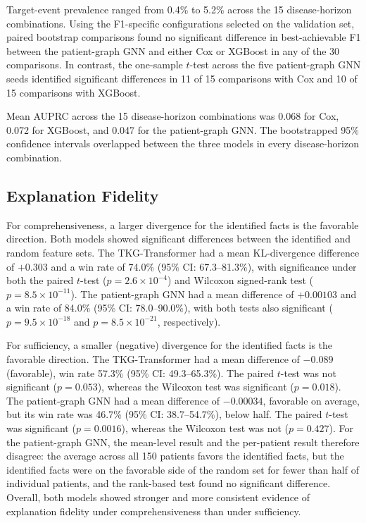 Target-event prevalence ranged from 0.4\% to 5.2\% across the 15 disease-horizon combinations. Using the F1-specific configurations selected on the validation set, paired bootstrap comparisons found no significant difference in best-achievable F1 between the patient-graph GNN and either Cox or XGBoost in any of the 30 comparisons. In contrast, the one-sample $t$-test across the five patient-graph GNN seeds identified significant differences in 11 of 15 comparisons with Cox and 10 of 15 comparisons with XGBoost.

Mean AUPRC across the 15 disease-horizon combinations was 0.068 for Cox, 0.072 for XGBoost, and 0.047 for the patient-graph GNN. The bootstrapped 95\% confidence intervals overlapped between the three models in every disease-horizon combination.

\subsection{Explanation Fidelity}
\label{sec:results-fidelity}

For comprehensiveness, a larger divergence for the identified facts is the favorable direction. Both models showed significant differences between the identified and random feature sets. The TKG-Transformer had a mean KL-divergence difference of $+0.303$ and a win rate of 74.0\% (95\% CI: 67.3--81.3\%), with significance under both the paired $t$-test ($p=2.6\times10^{-4}$) and Wilcoxon signed-rank test ($p=8.5\times10^{-11}$). The patient-graph GNN had a mean difference of $+0.00103$ and a win rate of 84.0\% (95\% CI: 78.0--90.0\%), with both tests also significant ($p=9.5\times10^{-18}$ and $p=8.5\times10^{-21}$, respectively).

For sufficiency, a smaller (negative) divergence for the identified facts is the favorable direction. The TKG-Transformer had a mean difference of $-0.089$ (favorable), win rate 57.3\% (95\% CI: 49.3--65.3\%). The paired $t$-test was not significant ($p=0.053$), whereas the Wilcoxon test was significant ($p=0.018$). The patient-graph GNN had a mean difference of $-0.00034$, favorable on average, but its win rate was 46.7\% (95\% CI: 38.7--54.7\%), below half. The paired $t$-test was significant ($p=0.0016$), whereas the Wilcoxon test was not ($p=0.427$). For the patient-graph GNN, the mean-level result and the per-patient result therefore disagree: the average across all 150 patients favors the identified facts, but the identified facts were on the favorable side of the random set for fewer than half of individual patients, and the rank-based test found no significant difference. Overall, both models showed stronger and more consistent evidence of explanation fidelity under comprehensiveness than under sufficiency.

